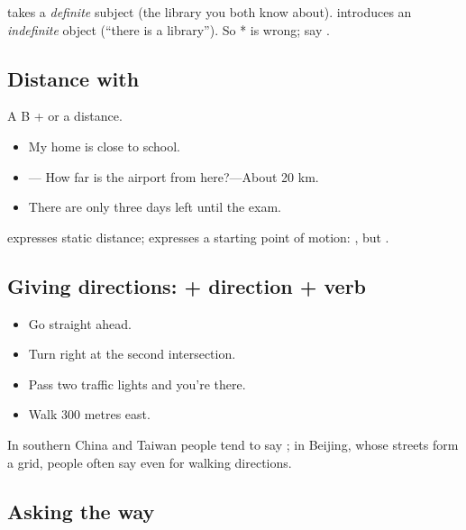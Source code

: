 \begin{important}[\zh{在} vs \zh{有}]
 takes a \emph{definite} subject (the library you both know about).
 introduces an \emph{indefinite} object (``there is a library''). So
* is wrong; say .
\end{important}

\subsection{Distance with }

A  B +  or a distance.
\begin{itemize}
  \item {} My home is close to school.
  \item {}--- How far is the airport from
        here?---About 20 km.
  \item {} There are only three days left until the exam.
\end{itemize}

\begin{important}[\zh{离} vs \zh{从}]
 expresses static distance;  expresses a starting point of motion:
, but .
\end{important}

\subsection{Giving directions:  + direction + verb}

\begin{itemize}
  \item {} Go straight ahead.
  \item {} Turn right at the second intersection.
  \item {} Pass two traffic lights and you're there.
  \item {} Walk 300 metres east.
\end{itemize}

In southern China and Taiwan people tend to say ; in Beijing, whose streets
form a grid, people often say  even for walking directions.

\subsection{Asking the way}

